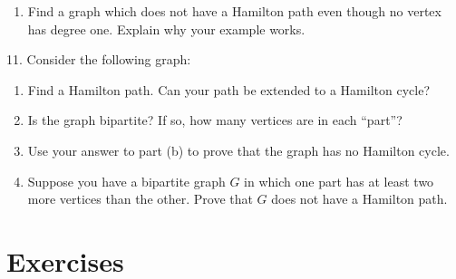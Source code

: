 \documentclass[10pt,]{book}
\theoremstyle{plain}
\theoremstyle{definition}
\numberwithin{equation}{chapter}
\newcommand{\vtx}[2]{node[fill,circle,inner sep=0pt, minimum size=4pt,label=#1:#2]{}}
\renewcommand{\v}{\vtx{above}{}}
\begin{document}
\begin{exerciselist}
\begin{enumerate}[label=(\alph*)]
\item\hypertarget{li-804}{}
          Find a graph which does not have a Hamilton path even though no vertex has degree one. Explain why your example works.
\end{enumerate}

\par\smallskip
\item[11.]\hypertarget{exercise-313}{}
        Consider the following graph:
\leavevmode%
\begin{figure}
\centering
{
}
\end{figure}
\par

        \leavevmode%
\begin{enumerate}[label=(\alph*)]
\item\hypertarget{li-805}{}Find a Hamilton path.  Can your path be extended to a Hamilton cycle?%
\item\hypertarget{li-806}{}Is the graph bipartite? If so, how many vertices are in each ``part''?%
\item\hypertarget{li-807}{}Use your answer to part (b) to prove that the graph has no Hamilton cycle.%
\item\hypertarget{li-808}{}Suppose you have a bipartite graph \(G\) in which one part has at least two more vertices than the other.  Prove that \(G\) does not have a Hamilton path.%
\end{enumerate}

\par\smallskip
\end{exerciselist}
\typeout{************************************************}
\typeout{************************************************}
\section[Exercises]{Exercises}\label{section-25}
\typeout{************************************************}
\typeout{************************************************}
\end{document}
